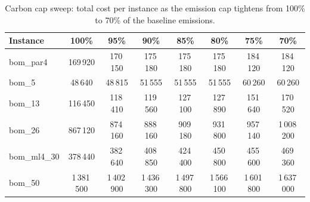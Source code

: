 \begin{table}[!htbp]\centering\small
\caption{Carbon cap sweep: total cost per instance as the emission cap tightens from 100\% to 70\% of the baseline emissions.}\label{tab:cap}
\begin{tabular}{lccccccc}
\toprule
Instance & 100\% & 95\% & 90\% & 85\% & 80\% & 75\% & 70\%\\
\midrule
bom\_par4 & 169\,920 & 170\,150 & 175\,180 & 175\,180 & 175\,180 & 184\,120 & 184\,120 \\
bom\_5 & 48\,640 & 48\,815 & 51\,555 & 51\,555 & 51\,555 & 60\,260 & 60\,260 \\
bom\_13 & 116\,450 & 118\,410 & 119\,560 & 127\,100 & 127\,890 & 151\,640 & 170\,520 \\
bom\_26 & 867\,120 & 874\,160 & 888\,160 & 909\,180 & 931\,800 & 957\,140 & 1\,008\,200 \\
bom\_ml4\_30 & 378\,440 & 382\,640 & 408\,850 & 424\,400 & 450\,800 & 455\,600 & 469\,360 \\
bom\_50 & 1\,381\,500 & 1\,402\,900 & 1\,436\,300 & 1\,497\,800 & 1\,566\,100 & 1\,601\,800 & 1\,637\,000 \\
\bottomrule
\end{tabular}
\end{table}
